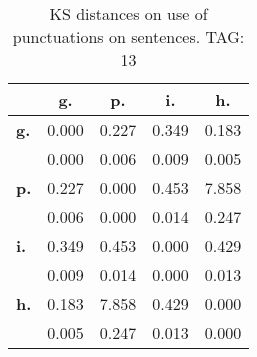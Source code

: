 \begin{table}[h!]
\begin{center}
\begin{tabular}{| l || c | c | c | c |}\hline
 & {\bf g.} & {\bf p.} & {\bf i.} & {\bf h.} \\\hline\hline
{\bf g.} & 0.000 & 0.227 & 0.349 & 0.183 \\
{\bf } & 0.000 & 0.006 & 0.009 & 0.005 \\\hline
{\bf p.} & 0.227 & 0.000 & 0.453 & 7.858 \\
{\bf } & 0.006 & 0.000 & 0.014 & 0.247 \\\hline
{\bf i.} & 0.349 & 0.453 & 0.000 & 0.429 \\
{\bf } & 0.009 & 0.014 & 0.000 & 0.013 \\\hline
{\bf h.} & 0.183 & 7.858 & 0.429 & 0.000 \\
{\bf } & 0.005 & 0.247 & 0.013 & 0.000 \\\hline
\end{tabular}
\caption{KS distances on use of punctuations on sentences. TAG: 13}
\end{center}
\end{table}